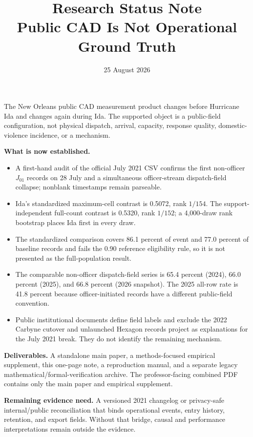 \documentclass[10pt]{article}
\title{\vspace{-2.2em}\textbf{Research Status Note}\\[0.25em]
\large Public CAD Is Not Operational Ground Truth}
\author{}
\date{25 August 2026}
\begin{document}
\maketitle
\thispagestyle{plain}
\vspace{-1.9em}

\begin{plainbox}[title=Current result]
The New Orleans public CAD measurement product changes before Hurricane Ida and changes again during Ida. The supported object is a public-field configuration, not physical dispatch, arrival, capacity, response quality, domestic-violence incidence, or a mechanism.
\end{plainbox}

\noindent\textbf{What is now established.}
\begin{itemize}
\item A first-hand audit of the official July 2021 CSV confirms the first non-officer $J_{01}$ records on 28 July and a simultaneous officer-stream dispatch-field collapse; nonblank timestamps remain parseable.
\item Ida's standardized maximum-cell contrast is 0.5072, rank $1/154$. The support-independent full-count contrast is 0.5320, rank $1/152$; a 4,000-draw rank bootstrap places Ida first in every draw.
\item The standardized comparison covers 86.1 percent of event and 77.0 percent of baseline records and fails the 0.90 reference eligibility rule, so it is not presented as the full-population result.
\item The comparable non-officer dispatch-field series is 65.4 percent (2024), 66.0 percent (2025), and 66.8 percent (2026 snapshot). The 2025 all-row rate is 41.8 percent because officer-initiated records have a different public-field convention.
\item Public institutional documents define field labels and exclude the 2022 Carbyne cutover and unlaunched Hexagon records project as explanations for the July 2021 break. They do not identify the remaining mechanism.
\end{itemize}

\noindent\textbf{Deliverables.} A standalone main paper, a methods-focused empirical supplement, this one-page note, a reproduction manual, and a separate legacy mathematical/formal-verification archive. The professor-facing combined PDF contains only the main paper and empirical supplement.

\noindent\textbf{Remaining evidence need.} A versioned 2021 changelog or privacy-safe internal/public reconciliation that binds operational events, entry history, retention, and export fields. Without that bridge, causal and performance interpretations remain outside the evidence.
\end{document}
